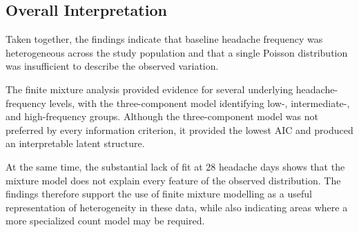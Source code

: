 \subsection{Overall Interpretation}

Taken together, the findings indicate that baseline headache
frequency was heterogeneous across the study population and that a
single Poisson distribution was insufficient to describe the
observed variation.

The finite mixture analysis provided evidence for several underlying
headache-frequency levels, with the three-component model identifying
low-, intermediate-, and high-frequency groups. Although the
three-component model was not preferred by every information
criterion, it provided the lowest AIC and produced an interpretable
latent structure.

At the same time, the substantial lack of fit at 28 headache days
shows that the mixture model does not explain every feature of the
observed distribution. The findings therefore support the use of
finite mixture modelling as a useful representation of heterogeneity
in these data, while also indicating areas where a more specialized
count model may be required.